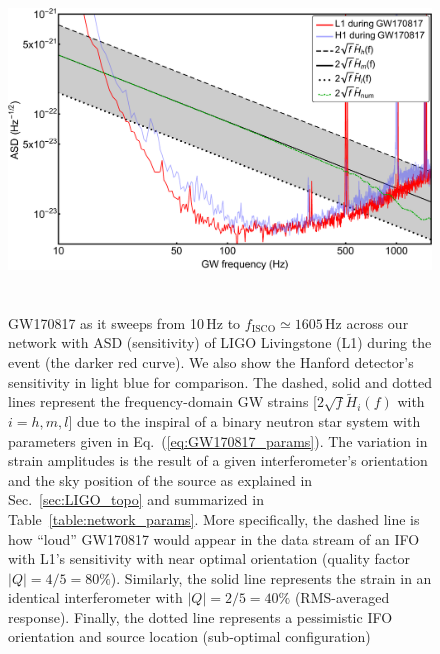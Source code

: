 \documentclass[prd,amsmath,amssymb,aps,floats,amsfonts,notitlepage,superscriptaddress,eqsecnum,nofootinbib,10pt]{revtex4-1}
\begin{document}
%
%
\begin{figure}[ht!]
\includegraphics[height=9cm]{../Figures/GW170817_strains.pdf}
\caption{GW170817 as it sweeps from 10\,Hz to $f_\text{ISCO} \simeq1605\,$Hz across our network with ASD (sensitivity) of 
LIGO Livingstone (L1) during the event (the darker red curve).
We also show the Hanford detector's sensitivity in light blue for comparison. The dashed, solid and dotted lines represent the 
frequency-domain GW strains [$2\sqrt{f} \tilde{H}_i(f)$ with $i=h,m,l$] due to the inspiral of
a binary neutron star system with parameters given in Eq.~(\ref{eq:GW170817_params}).
The variation in strain amplitudes is the result of a given interferometer's orientation and the sky position of the source 
as explained in Sec.~\ref{sec:LIGO_topo} and summarized in Table~\ref{table:network_params}.
More specifically, the dashed line is how ``loud'' GW170817 would appear in the data stream of an IFO with L1's sensitivity
with near optimal orientation
(quality factor $|Q|=4/5=80\%$). Similarly, the solid line represents the strain in an identical interferometer with 
$|Q|=2/5=40\%$ (RMS-averaged response). %
Finally, the dotted line represents a pessimistic IFO orientation and source location (sub-optimal configuration)
}
\end{figure}
\end{document}
